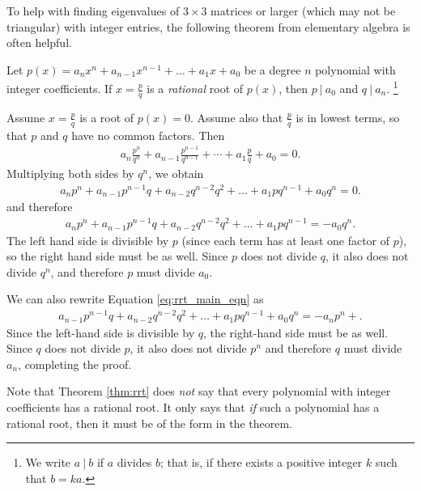 \documentclass[12pt,letterpaper,reqno]{article}
\numberwithin{equation}{section}
\begin{document}
To help with finding eigenvalues of $3 \times 3$ matrices or larger (which may not be triangular) with integer entries, the following theorem from elementary algebra is often helpful.

\begin{thm}\label{thm:rrt}
	Let $p(x)=a_nx^n+a_{n-1}x^{n-1}+\dots+a_1x+a_0$ be a degree $n$ polynomial with integer coefficients. If $x=\frac{p}{q}$ is a \emph{rational} root of $p(x)$, then $p \ \vert \ a_0$ and $q \ \vert \ a_n$. \footnote{We write $a \ \vert \ b$ if $a$ divides $b$; that is, if there exists a positive integer $k$ such that $b=ka$.}
\end{thm}

\begin{pf}
	Assume $x=\frac{p}{q}$ is a root of $p(x)=0$. Assume also that $\frac{p}{q}$ is in lowest terms, so that $p$ and $q$ have no common factors. Then
	\begin{align*}
		a_n\frac{p^n}{q^n}+a_{n-1}\frac{p^{n-1}}{q^{n-1}}+\cdots +a_1\frac{p}{q}+a_0=0.
	\end{align*}
	Multiplying both sides by $q^n$, we obtain
	\begin{align}\label{eq:rrt_main_eqn}
		a_np^n+a_{n-1}p^{n-1}q+a_{n-2}q^{n-2}q^2+\dots+a_1pq^{n-1}+a_0q^n=0.
	\end{align}
	and therefore
	\begin{align*}
		a_np^n+a_{n-1}p^{n-1}q+a_{n-2}q^{n-2}q^2+\dots+a_1pq^{n-1}=-a_0q^n.
	\end{align*}
	The left hand side is divisible by $p$ (since each term has at least one factor of $p$), so the right hand side must be as well. Since $p$ does not divide $q$, it also does not divide $q^n$, and therefore $p$ must divide $a_0$.
	
	We can also rewrite Equation \eqref{eq:rrt_main_eqn} as 
	\begin{align*}
		a_{n-1}p^{n-1}q+a_{n-2}q^{n-2}q^2+\dots+a_1pq^{n-1}+a_0q^n=-a_np^n+.
	\end{align*}
	Since the left-hand side is divisible by $q$, the right-hand side must be as well. Since $q$ does not divide $p$, it also does not divide $p^n$ and therefore $q$ must divide $a_n$, completing the proof.
\end{pf}
Note that Theorem \ref{thm:rrt} does \emph{not} say that every polynomial with integer coefficients has a rational root. It only says that \emph{if} such a polynomial has a rational root, then it must be of the form in the theorem.
\end{document}
